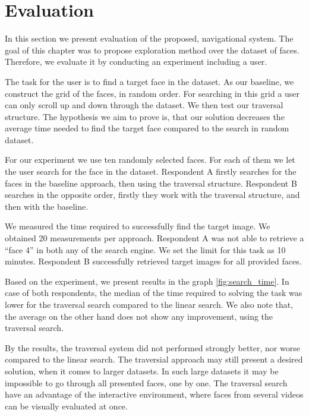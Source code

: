 \section{Evaluation}

In this section we present evaluation of the proposed, navigational system. The goal of this chapter was to propose exploration method over the dataset of faces. Therefore, we evaluate it by conducting an experiment including a user.

The task for the user is to find a target face in the dataset. As our baseline, we construct the grid of the faces, in random order. For searching in this grid a user can only scroll up and down through the dataset. We then test our traversal structure. The hypothesis we aim to prove is, that our solution decreases the average time needed to find the target face compared to the search in random dataset.

For our experiment we use ten randomly selected faces. For each of them we let the user search for the face in the dataset. Respondent A firstly searches for the faces in the baseline approach, then using the traversal structure. Respondent B searches in the opposite order, firstly they work with the traversal structure, and then with the baseline.

We measured the time required to successfully find the target image. We obtained 20 measurements per approach. Respondent A was not able to retrieve a ``face 4'' in both any of the search engine. We set the limit for this task as 10 minutes.  Respondent B successfully retrieved target images for all provided faces.

Based on the experiment, we present results in the graph \ref{fig:search_time}. In case of both respondents, the median of the time required to solving the task was lower for the traversal search compared to the linear search. We also note that, the average on the other hand does not show any improvement, using the traversal search.

By the results, the traversal system did not performed strongly better, nor worse compared to the linear search. The traversial approach may still present a desired solution, when it comes to larger datasets. In such large datasets it may be impossible to go through all presented faces, one by one. The traversal search have an advantage of the interactive environment, where faces from several videos can be visually evaluated at once.




